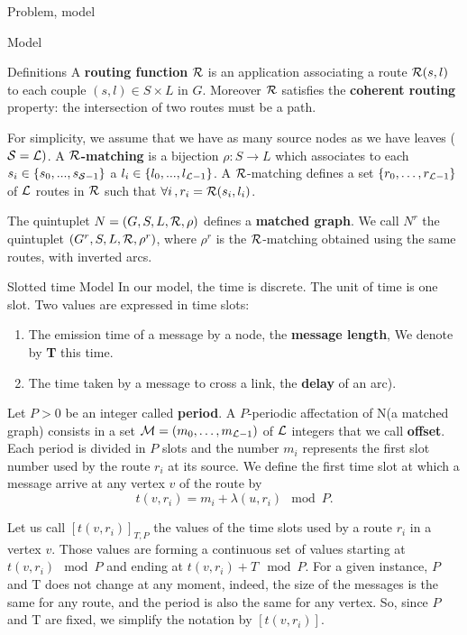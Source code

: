 \documentclass[a4paper,10pt]{report}
\newcommand\rmatching{${\cal R}$-matching\xspace}
\newcommand\matchedgraph{{\bf matched graph}}
\begin{document}
\begin{chapter}{Problem, model}
\begin{section}{Model}
\begin{subsection}{Definitions}
A {\bf routing function}  ${\cal R}$ is an application associating a route  ${\cal R}(s,l)$ to each couple $(s,l) \in S \times L$ in $G$.
Moreover ${\cal R}$ satisfies the {\bf coherent routing} property: the intersection of two routes must be a path.

For simplicity, we assume that we have as many source nodes as we have leaves (${\cal S} = {\cal L})$.
A {\bf ${\cal R}$-matching} is a bijection $\rho:S\rightarrow L$ which associates to each $s_i \in \{s_0,...,s_{{\cal S}-1}\}$ 
a $l_i \in \{l_0,...,l_{{\cal L}-1}\}$.
A \rmatching defines a set $\{r_0, \ldots ,r_{{\cal L}-1}\}$ of ${\cal L}$ routes in ${\cal R}$ such that $\forall i\,, r_i = {\cal R}(s_i,l_i)$.

The quintuplet $N=(G,S,L,{\cal R},\rho)$ defines a \matchedgraph. We call $N^r$ the quintuplet $(G^r,S,L,{\cal R},\rho^r)$, 
where $\rho^r$ is the \rmatching obtained using the same routes, with inverted arcs.

\end{subsection}
\begin{subsection}{Slotted time Model}
In our model, the time is discrete. The unit of time is one slot. Two values are expressed in time slots: 
\begin{enumerate}
 \item The emission time of a message by a node, the {\bf message length}, We denote by {\bf T} this time.
 \item The time taken by a message to cross a link, the {\bf delay} of an arc).
\end{enumerate}

Let $P>0$ be an integer called {\bf period}. 
A $P$-periodic affectation of N(a matched graph) consists in a set  ${\cal M}=(m_0, \ldots ,m_{{\cal L}-1})$
of ${\cal L}$ integers that we call {\bf offset}. 
Each period is divided in $P$ slots and the number $m_i$ represents the first slot number used by the route $r_i$ at its source.
We define the first time slot at which a message arrive at any vertex $v$ of the route by $$t(v,r_i) = m_i+\lambda(u,r_i) \mod P.$$

Let us call $[t(v,r_i)]_{T,P}$ the values of the time slots used by a route $r_i$ in a vertex $v$. 
Those values are forming a continuous set of values starting at $t(v,r_i) \mod P$ and ending at $t(v,r_i) + T \mod P$.
For a given instance, $P$ and T does not change at any moment, indeed, the size of the messages is the same for any route, and the period is also the same for any vertex.
So, since $P$ and T are fixed, we simplify the notation by $[t(v,r_i)]$.


\end{subsection}
\end{section}
\end{chapter}
\end{document}

